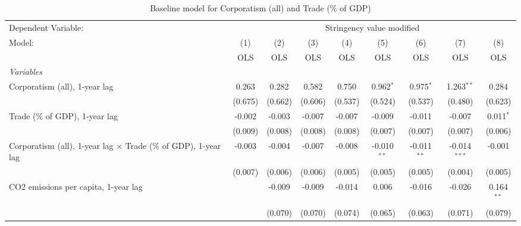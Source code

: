
\begin{table}[htbp]
   \caption{Baseline model for Corporatism (all) and Trade (\% of GDP)}
   \centering
   \begin{tabular}{lcccccccc}
      \toprule
      Dependent Variable: & \multicolumn{8}{c}{Stringency value modified}\\
      Model:                                                                 & (1)     & (2)     & (3)         & (4)         & (5)           & (6)           & (7)            & (8)\\  
                                                                             &  OLS    & OLS     & OLS         & OLS         & OLS           & OLS           & OLS            & OLS\\  
      \midrule
      \emph{Variables}\\
      Corporatism (all), 1-year lag                                          & 0.263   & 0.282   & 0.582       & 0.750       & 0.962$^{*}$   & 0.975$^{*}$   & 1.263$^{**}$   & 0.284\\   
                                                                             & (0.675) & (0.662) & (0.606)     & (0.537)     & (0.524)       & (0.537)       & (0.480)        & (0.623)\\   
      Trade (\% of GDP), 1-year lag                                          & -0.002  & -0.003  & -0.007      & -0.007      & -0.009        & -0.011        & -0.007         & 0.011$^{*}$\\   
                                                                             & (0.009) & (0.008) & (0.008)     & (0.008)     & (0.007)       & (0.007)       & (0.007)        & (0.006)\\   
      Corporatism (all), 1-year lag $\times$ Trade (\% of GDP), 1-year lag   & -0.003  & -0.004  & -0.007      & -0.008      & -0.010$^{**}$ & -0.011$^{**}$ & -0.014$^{***}$ & -0.001\\   
                                                                             & (0.007) & (0.006) & (0.006)     & (0.005)     & (0.005)       & (0.005)       & (0.004)        & (0.005)\\   
      CO2 emissions per capita, 1-year lag                                   &         & -0.009  & -0.009      & -0.014      & 0.006         & -0.016        & -0.026         & 0.164$^{**}$\\   
                                                                             &         & (0.070) & (0.070)     & (0.074)     & (0.065)       & (0.063)       & (0.071)        & (0.079)\\   

\end{tabular}
\end{table}
